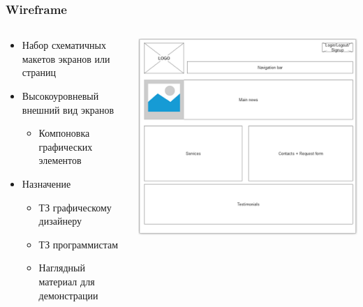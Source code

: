\documentclass{../../slides-style}
\begin{document}
    \begin{frame}
        \frametitle{Wireframe}
        \begin{columns}
            \begin{column}{0.5\textwidth}
                \begin{itemize}
                    \item Набор схематичных макетов экранов или страниц
                    \item Высокоуровневый внешний вид экранов
                    \begin{itemize}
                        \item Компоновка графических элементов
                    \end{itemize}
                    \item Назначение
                    \begin{itemize}
                        \item ТЗ графическому дизайнеру
                        \item ТЗ программистам
                        \item Наглядный материал для демонстрации
                    \end{itemize}
                \end{itemize}
            \end{column}
            \begin{column}{0.5\textwidth}
                \begin{center}
                    \includegraphics[width=\textwidth]{wireframe.png}
                \end{center}
            \end{column}
        \end{columns}
    \end{frame}
\end{document}
